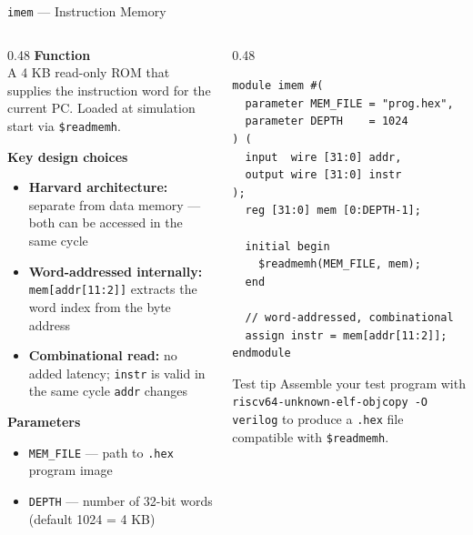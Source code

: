 \documentclass[aspectratio=169,10pt]{beamer}
\begin{document}
\begin{frame}[fragile]{\texttt{imem} --- Instruction Memory}
  \begin{columns}[T]
    \begin{column}{0.48\textwidth}
      \textbf{Function}\\
      A 4 KB read-only ROM that supplies the instruction word for the current PC.
      Loaded at simulation start via \texttt{\$readmemh}.

      \vspace{0.6em}
      \textbf{Key design choices}
      \begin{itemize}\small
        \item \textbf{Harvard architecture:} separate from data memory --- both can be accessed in the same cycle
        \item \textbf{Word-addressed internally:} \texttt{mem[addr[11:2]]} extracts the word index from the byte address
        \item \textbf{Combinational read:} no added latency; \texttt{instr} is valid in the same cycle \texttt{addr} changes
      \end{itemize}

      \vspace{0.6em}
      \textbf{Parameters}
      \begin{itemize}\small
        \item \texttt{MEM\_FILE} --- path to \texttt{.hex} program image
        \item \texttt{DEPTH} --- number of 32-bit words (default 1024 = 4 KB)
      \end{itemize}
    \end{column}
    \begin{column}{0.48\textwidth}
\begin{lstlisting}
module imem #(
  parameter MEM_FILE = "prog.hex",
  parameter DEPTH    = 1024
) (
  input  wire [31:0] addr,
  output wire [31:0] instr
);
  reg [31:0] mem [0:DEPTH-1];

  initial begin
    $readmemh(MEM_FILE, mem);
  end

  // word-addressed, combinational
  assign instr = mem[addr[11:2]];
endmodule
\end{lstlisting}
      \vspace{0.4em}
      \begin{exampleblock}{Test tip}
        \small
        Assemble your test program with \texttt{riscv64-unknown-elf-objcopy -O verilog} to produce a \texttt{.hex} file compatible with \texttt{\$readmemh}.
      \end{exampleblock}
    \end{column}
  \end{columns}
\end{frame}
\end{document}
